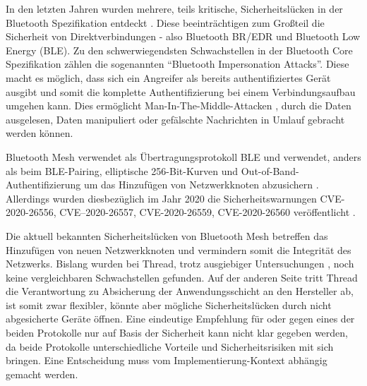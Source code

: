 \documentclass{article}
\begin{document}
In den letzten Jahren wurden mehrere, teils kritische, Sicherheitslücken in der
Bluetooth Spezifikation entdeckt \parencite{BluetoothIssues}.
Diese beeinträchtigen zum Großteil die Sicherheit von Direktverbindungen - also
Bluetooth BR/EDR und Bluetooth Low Energy (BLE). Zu den schwerwiegendsten
Schwachstellen in der Bluetooth Core Spezifikation zählen die sogenannten
“Bluetooth Impersonation Attacks”. Diese macht es möglich, dass sich ein
Angreifer als bereits authentifiziertes Gerät ausgibt und somit die komplette
Authentifizierung bei einem Verbindungsaufbau umgehen kann. Dies ermöglicht
Man-In-The-Middle-Attacken \parencite{BluetoothLowEnergyAttackOxford}, durch
die Daten ausgelesen, Daten manipuliert oder gefälschte Nachrichten in Umlauf
gebracht werden können.

Bluetooth Mesh verwendet als Übertragungsprotokoll BLE und verwendet, anders
als beim BLE-Pairing, elliptische 256-Bit-Kurven und
Out-of-Band-Authentifizierung um das Hinzufügen von Netzwerkknoten abzusichern
\parencite{BluetoothSpec}.
Allerdings wurden diesbezüglich im Jahr 2020 die Sicherheitswarnungen
CVE-2020-26556, CVE–2020-26557, CVE-2020-26559, CVE-2020-26560 veröffentlicht
\parencite{BluetoothIssues}.

Die aktuell bekannten Sicherheitslücken von Bluetooth Mesh betreffen das
Hinzufügen von neuen Netzwerkknoten \parencite{BluetoothIssues} und vermindern
somit die Integrität des Netzwerks. Bislang wurden bei Thread, trotz
ausgiebiger Untersuchungen \parencite{ThreadSecurityCSIAC, ThreadSecurityEmbeddedCom},
noch keine vergleichbaren Schwachstellen gefunden. Auf der anderen Seite tritt
Thread die Verantwortung zu Absicherung der Anwendungsschicht an den Hersteller
ab, ist somit zwar flexibler, könnte aber mögliche Sicherheitslücken durch
nicht abgesicherte Geräte öffnen. Eine eindeutige Empfehlung für oder gegen
eines der beiden Protokolle nur auf Basis der Sicherheit kann nicht klar
gegeben werden, da beide Protokolle unterschiedliche Vorteile und
Sicherheitsrisiken mit sich bringen. Eine Entscheidung muss vom
Implementierung-Kontext abhängig gemacht werden.

\printbibliography[heading=none]
\end{document}
